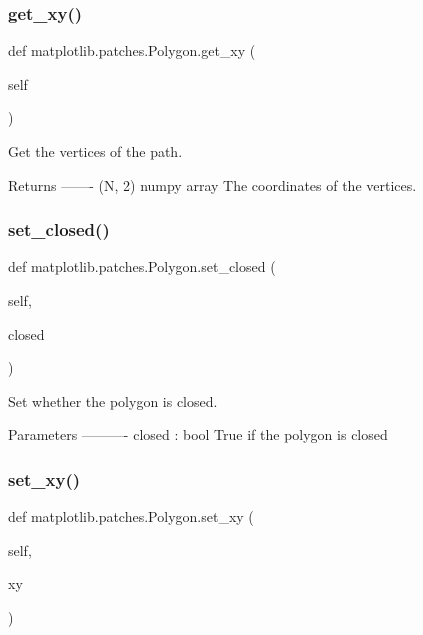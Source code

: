 \subsubsection{\texorpdfstring{get\+\_\+xy()}{get\_xy()}}
{\footnotesize\ttfamily def matplotlib.\+patches.\+Polygon.\+get\+\_\+xy (\begin{DoxyParamCaption}\item[{}]{self }\end{DoxyParamCaption})}

\begin{DoxyVerb}Get the vertices of the path.

Returns
-------
(N, 2) numpy array
    The coordinates of the vertices.
\end{DoxyVerb}
 \mbox{\label{classmatplotlib_1_1patches_1_1Polygon_a776170097e742cb707c80dc474b473f8}} 
\subsubsection{\texorpdfstring{set\+\_\+closed()}{set\_closed()}}
{\footnotesize\ttfamily def matplotlib.\+patches.\+Polygon.\+set\+\_\+closed (\begin{DoxyParamCaption}\item[{}]{self,  }\item[{}]{closed }\end{DoxyParamCaption})}

\begin{DoxyVerb}Set whether the polygon is closed.

Parameters
----------
closed : bool
   True if the polygon is closed
\end{DoxyVerb}
 \mbox{\label{classmatplotlib_1_1patches_1_1Polygon_a1867a3388b4e3553e86de19874dd466e}} 
\subsubsection{\texorpdfstring{set\+\_\+xy()}{set\_xy()}}
{\footnotesize\ttfamily def matplotlib.\+patches.\+Polygon.\+set\+\_\+xy (\begin{DoxyParamCaption}\item[{}]{self,  }\item[{}]{xy }\end{DoxyParamCaption})}

